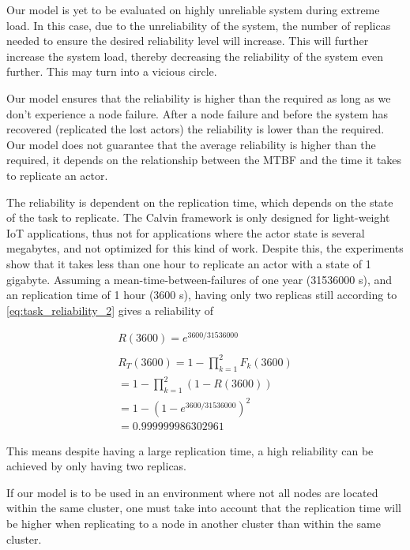 \documentclass{cslthse-msc}
\begin{document}
Our model is yet to be evaluated on highly unreliable system during extreme load. In this case, due to the unreliability of the system, the number of replicas needed to ensure the desired reliability level will increase. This will further increase the system load, thereby decreasing the reliability of the system even further. This may turn into a vicious circle.

Our model ensures that the reliability is higher than the required as long as we don't experience a node failure. After a node failure and before the system has recovered (replicated the lost actors) the reliability is lower than the required. Our model does not guarantee that the average reliability is higher than the required, it depends on the relationship between the MTBF and the time it takes to replicate an actor.

The reliability is dependent on the replication time, which depends on the state of the task to replicate. The Calvin framework is only designed for light-weight IoT applications, thus not for applications where the actor state is several megabytes, and not optimized for this kind of work. Despite this, the experiments show that it takes less than one hour to replicate an actor with a state of 1 gigabyte. Assuming a mean-time-between-failures of one year (31536000 s), and an replication time of 1 hour (3600 s), having only two replicas still according to \cref{eq:task_reliability_2} gives a reliability of

\begin{equation*}
\begin{split}
R(3600) = e^{3600/31536000}\\
\\
R_{T}(3600) = 1 - \prod\limits_{k=1}^2 F_{k}(3600)\\
= 1 - \prod\limits_{k=1}^2 (1 - R(3600))\\
= 1 - (1 - e^{3600/31536000})^2\\
= 0.999999986302961
\end{split}
\end{equation*}

This means despite having a large replication time, a high reliability can be achieved by only having two replicas.

If our model is to be used in an environment where not all nodes are located within the same cluster, one must take into account that the replication time will be higher when replicating to a node in another cluster than within the same cluster.
\end{document}

